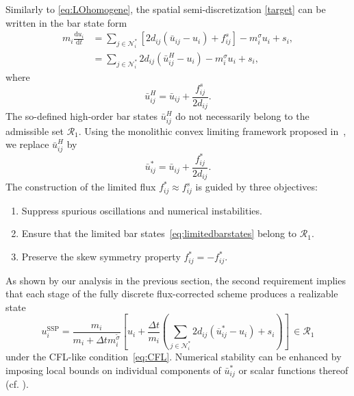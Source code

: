 \documentclass[preprint, 11pt]{elsarticle}
\newcommand{\diff}{\mathrm{d} }
\newcommand{\N}{\mathcal{N}}
\begin{document}
Similarly to \eqref{eq:LOhomogene},
the spatial semi-discretization \eqref{target} can be written
in the bar state form
 \begin{equation}\label{target2}
   \begin{split}
  m_i\frac{\diff u_i}{\diff t}
  &=\sum_{j \in\N_i^*} [2d_{ij} (\bar u_{ij} -u_i)+f_{ij}^s] - m_i^{\sigma}u_i + s_i,\\
  &=\sum_{j \in\N_i^*} 2d_{ij} (\bar u_{ij}^H -u_i) - m_i^{\sigma}u_i + s_i,
  \end{split}
\end{equation}
where $$\bar u_{ij}^H =
\bar u_{ij} + \frac{f_{ij}^s}{2d_{ij}}.$$
The so-defined high-order bar states $\bar u_{ij}^H$
do not necessarily
belong to the admissible set $\mathcal{R}_1$.
Using the monolithic convex limiting framework proposed in~\cite{kuzmin2020}, we replace $\bar u_{ij}^H$ by
\begin{equation}\label{eq:limitedbarstates}
    \bar u_{ij}^* = \bar u_{ij} +\frac{f_{ij}^*}{2d_{ij}}.
\end{equation}
The construction of the limited flux $f_{ij}^*\approx f_{ij}^s$ is guided by three objectives:
\begin{enumerate}
    \item Suppress spurious oscillations and numerical instabilities.
    \item Ensure that the limited bar states~\eqref{eq:limitedbarstates} belong to $\mathcal{R}_1$.
    \item Preserve the skew symmetry property $f_{ij}^* = -f_{ij}^*$.
\end{enumerate}
As shown by our analysis in the previous section, the second requirement implies that each stage of the fully discrete flux-corrected scheme produces a realizable state
\begin{equation}\label{eq:fullydiscreteMCL}
    u_i^{\mathrm{SSP}} = \frac{m_i}{m_i + \Delta t m_i^{\tilde\sigma}}\left[ u_i + \frac{\Delta t}{m_i}\left(\sum_{j\in\N_i^*}2d_{ij} (\overline{u}_{ij}^* -u_i) + s_i\right)\right]\,\in\mathcal{R}_1
\end{equation}
under the CFL-like condition~\eqref{eq:CFL}. Numerical stability can be enhanced by imposing local bounds on individual components of $\bar u_{ij}^*$ or scalar functions thereof (cf. \cite{dobrev2018, hajduk2019, hajduk2021, kuzmin2020, kuzmin2023, moujaes2025}).
\end{document}
